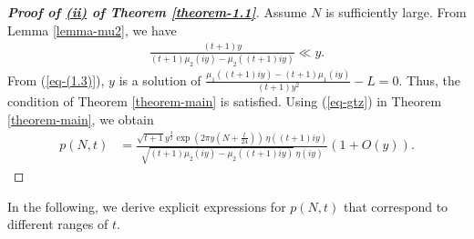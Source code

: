 \documentclass[11pt]{amsart}
\theoremstyle{plain}
\numberwithin{equation}{section}
\begin{document}
		\begin{proof}[\textbf{\boldmath Proof of  \hyperlink{thm1.1ii}{{(ii)}} of Theorem \ref{theorem-1.1}}] 
			Assume $N$ is sufficiently large. From Lemma \ref{lemma-mu2}, we have
			\begin{align}
				\frac{(t+1)y}{(t+1)\mu_{2}(iy)-\mu_{2}((t+1)iy)}\ll y.   
			\end{align} 
			From (\ref{eq-(1.3)}), $y$ is a solution of  $\frac{\mu_{1}((t+1)iy)-(t+1)\mu_{1}(iy)}{(t+1)y^{2}}- L=0$. Thus, the condition of Theorem \ref{theorem-main} is satisfied. Using (\ref{eq-gtz}) in Theorem \ref{theorem-main}, we obtain
			\begin{align*}
				p(N,t)&=\frac{\sqrt{t+1}y^{\frac{3}{2}} \exp\left(2\pi y\left(N+\frac{t}{24}\right)\right)\,\eta((t+1)iy)}{\sqrt{(t+1)\mu_{2}(iy)-\mu_{2}((t+1)iy)}\,\eta(iy)}\left(1+O(y)\right).   
			\end{align*}
		\end{proof}
		In the following, we derive explicit expressions for $p(N,t)$ that correspond to different ranges of $t$.
\end{document}
